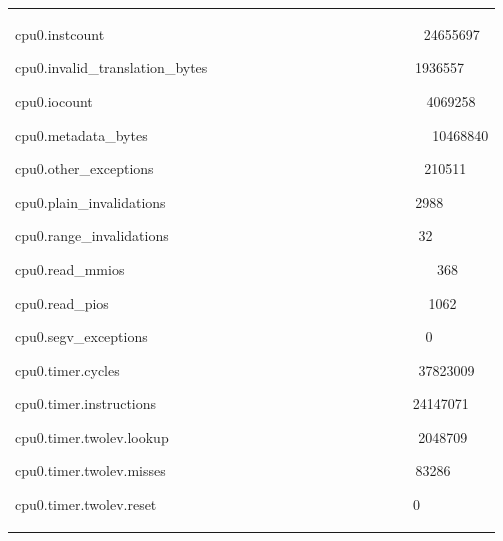 \documentclass[a4paper]{article}
\begin{document}
\begin{flushleft}
\begin{tiny}
\begin{supertabular}{|m{6.34626in}|}
{\ttfamily cpu0.instcount
\ \ \ \ \ \ \ \ \ \ \ \ \ \ \ \ \ \ \ \ \ \ \ \ \ \ \ \ \ \ \ \ \ \ \ \ \ \ \ \ \ \ \ \ \ 24655697}

{\ttfamily cpu0.invalid\_translation\_bytes
\ \ \ \ \ \ \ \ \ \ \ \ \ \ \ \ \ \ \ \ \ \ \ \ \ \ \ \ \ 1936557}

{\ttfamily cpu0.iocount
\ \ \ \ \ \ \ \ \ \ \ \ \ \ \ \ \ \ \ \ \ \ \ \ \ \ \ \ \ \ \ \ \ \ \ \ \ \ \ \ \ \ \ \ \ \ \ 4069258}

{\ttfamily cpu0.metadata\_bytes
\ \ \ \ \ \ \ \ \ \ \ \ \ \ \ \ \ \ \ \ \ \ \ \ \ \ \ \ \ \ \ \ \ \ \ \ \ \ \ \ 10468840}

{\ttfamily cpu0.other\_exceptions
\ \ \ \ \ \ \ \ \ \ \ \ \ \ \ \ \ \ \ \ \ \ \ \ \ \ \ \ \ \ \ \ \ \ \ \ \ \ 210511}

{\ttfamily cpu0.plain\_invalidations
\ \ \ \ \ \ \ \ \ \ \ \ \ \ \ \ \ \ \ \ \ \ \ \ \ \ \ \ \ \ \ \ \ \ \ 2988}

{\ttfamily cpu0.range\_invalidations
\ \ \ \ \ \ \ \ \ \ \ \ \ \ \ \ \ \ \ \ \ \ \ \ \ \ \ \ \ \ \ \ \ \ \ 32}

{\ttfamily cpu0.read\_mmios
\ \ \ \ \ \ \ \ \ \ \ \ \ \ \ \ \ \ \ \ \ \ \ \ \ \ \ \ \ \ \ \ \ \ \ \ \ \ \ \ \ \ \ \ 368}

{\ttfamily cpu0.read\_pios
\ \ \ \ \ \ \ \ \ \ \ \ \ \ \ \ \ \ \ \ \ \ \ \ \ \ \ \ \ \ \ \ \ \ \ \ \ \ \ \ \ \ \ \ \ 1062}

{\ttfamily cpu0.segv\_exceptions
\ \ \ \ \ \ \ \ \ \ \ \ \ \ \ \ \ \ \ \ \ \ \ \ \ \ \ \ \ \ \ \ \ \ \ \ \ \ \ 0}

{\ttfamily cpu0.timer.cycles
\ \ \ \ \ \ \ \ \ \ \ \ \ \ \ \ \ \ \ \ \ \ \ \ \ \ \ \ \ \ \ \ \ \ \ \ \ \ \ \ \ \ 37823009}

{\ttfamily cpu0.timer.instructions
\ \ \ \ \ \ \ \ \ \ \ \ \ \ \ \ \ \ \ \ \ \ \ \ \ \ \ \ \ \ \ \ \ \ \ \ 24147071}

{\ttfamily cpu0.timer.twolev.lookup
\ \ \ \ \ \ \ \ \ \ \ \ \ \ \ \ \ \ \ \ \ \ \ \ \ \ \ \ \ \ \ \ \ \ \ 2048709}

{\ttfamily cpu0.timer.twolev.misses
\ \ \ \ \ \ \ \ \ \ \ \ \ \ \ \ \ \ \ \ \ \ \ \ \ \ \ \ \ \ \ \ \ \ \ 83286}

{\ttfamily cpu0.timer.twolev.reset
\ \ \ \ \ \ \ \ \ \ \ \ \ \ \ \ \ \ \ \ \ \ \ \ \ \ \ \ \ \ \ \ \ \ \ \ 0}


\end{supertabular}
\end{tiny}
\end{flushleft}
\end{document}
